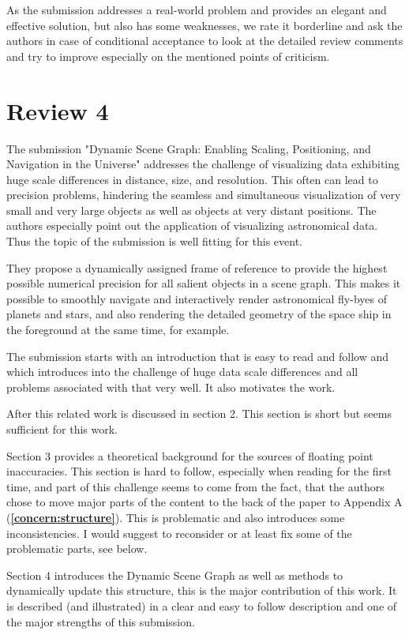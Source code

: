 \documentclass{article}
\let\oldref\ref
\renewcommand{\ref}[1]{{\color{blue}(\textbf{\oldref{#1}})}}
\begin{document}
As the submission addresses a real-world problem and provides an elegant and effective solution, but also has some weaknesses, we rate it borderline and ask the authors in case of conditional acceptance to look at the detailed review comments and try to improve especially on the mentioned points of criticism.

\section*{Review 4}

The submission "Dynamic Scene Graph: Enabling Scaling, Positioning, and Navigation in the Universe" addresses the challenge of visualizing data exhibiting huge scale differences in distance, size, and resolution.
This often can lead to precision problems, hindering the seamless and simultaneous visualization of very small and very large objects as well as objects at very distant positions.
The authors especially point out the application of visualizing astronomical data.
Thus the topic of the submission is well fitting for this event.

They propose a dynamically assigned frame of reference to provide the highest possible numerical precision for all salient objects in a scene graph. This makes it possible to smoothly navigate and interactively render astronomical fly-byes of planets and stars, and also rendering the detailed geometry of the space ship in the foreground at the same time, for example.

The submission starts with an introduction that is easy to read and follow and which introduces into the challenge of huge data scale differences and all problems associated with that very well. 
It also motivates the work.

After this related work is discussed in section 2.
This section is short but seems sufficient for this work.

Section 3 provides a theoretical background for the sources of floating point inaccuracies.
This section is hard to follow, especially when reading for the first time, and part of this challenge seems to come from the fact, that the authors chose to move major parts of the content to the back of the paper to Appendix A \ref{concern:structure}.
This is problematic and also introduces some inconsistencies.
I would suggest to reconsider or at least fix some of the problematic parts, see below.

Section 4 introduces the Dynamic Scene Graph as well as methods to dynamically update this structure, this is the major contribution of this work.
It is described (and illustrated) in a clear and easy to follow description and one of the major strengths of this submission.
\end{document}
